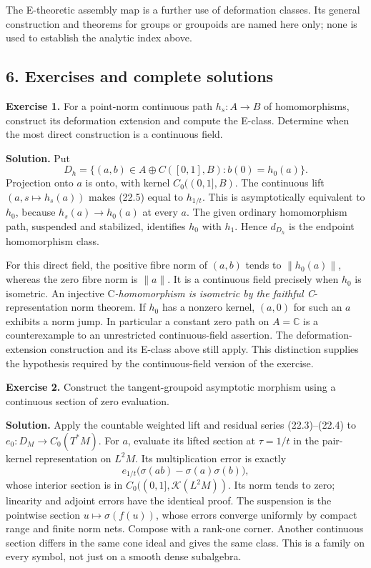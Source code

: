 \documentclass[
  11pt,
]{article}
\begin{document}
The E-theoretic assembly map is a further use of deformation classes.
Its general construction and theorems for groups or groupoids are named
here only; none is used to establish the analytic index above.

\subsection{6. Exercises and complete
solutions}\label{exercises-and-complete-solutions}

\textbf{Exercise 1.} For a point-norm continuous path \(h_s:A\to B\) of
homomorphisms, construct its deformation extension and compute the
E-class. Determine when the most direct construction is a continuous
field.

\textbf{Solution.} Put \[
D_h=\{(a,b)\in A\oplus C([0,1],B):b(0)=h_0(a)\}.
\tag{22.30}
\] Projection onto \(a\) is onto, with kernel \(C_0((0,1],B)\). The
continuous lift \((a,s\mapsto h_s(a))\) makes (22.5) equal to
\(h_{1/t}\). This is asymptotically equivalent to \(h_0\), because
\(h_s(a)\to h_0(a)\) at every \(a\). The given ordinary homomorphism
path, suspended and stabilized, identifies \(h_0\) with \(h_1\). Hence
\(d_{D_h}\) is the endpoint homomorphism class.

For this direct field, the positive fibre norm of \((a,b)\) tends to
\(\|h_0(a)\|\), whereas the zero fibre norm is \(\|a\|\). It is a
continuous field precisely when \(h_0\) is isometric. An injective
C\emph{-homomorphism is isometric by the faithful C}-representation norm
theorem. If \(h_0\) has a nonzero kernel, \((a,0)\) for such an \(a\)
exhibits a norm jump. In particular a constant zero path on
\(A=\mathbb C\) is a counterexample to an unrestricted continuous-field
assertion. The deformation-extension construction and its E-class above
still apply. This distinction supplies the hypothesis required by the
continuous-field version of the exercise.

\textbf{Exercise 2.} Construct the tangent-groupoid asymptotic morphism
using a continuous section of zero evaluation.

\textbf{Solution.} Apply the countable weighted lift and residual series
(22.3)--(22.4) to \(e_0:D_M\to C_0(T^*M)\). For \(a\), evaluate its
lifted section at \(\tau=1/t\) in the pair-kernel representation on
\(L^2M\). Its multiplication error is exactly \[
e_{1/t}\bigl(\sigma(ab)-\sigma(a)\sigma(b)\bigr),
\] whose interior section is in \(C_0((0,1],\mathcal K(L^2M))\). Its
norm tends to zero; linearity and adjoint errors have the identical
proof. The suspension is the pointwise section \(u\mapsto\sigma(f(u))\),
whose errors converge uniformly by compact range and finite norm nets.
Compose with a rank-one corner. Another continuous section differs in
the same cone ideal and gives the same class. This is a family on every
symbol, not just on a smooth dense subalgebra.
\end{document}
